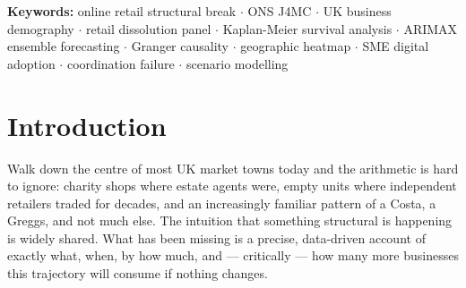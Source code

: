 \documentclass[12pt,a4paper]{article}
\begin{document}
\begin{abstract}
\medskip\noindent
Monthly Granger causality testing (lags 1--12, COVID moratorium excluded,
$n=118$) finds dominant causality at lag~1 ($F=25.26$, $p<0.001$) and
lag~2 ($F=4.43$, $p=0.014$), \textbf{sharpening the previously estimated
24-month annual lag to a 1--2 month transmission window}.

\medskip\noindent
Scenario forecasting using a weighted ensemble model (52\% Holt linear
smoothing + 48\% ARIMAX(2,1,1)) --- validated by rolling 12-month-ahead
backtests, OOS RMSE~$\approx$2,800 --- projects \textbf{547,167 cumulative
retail dissolutions} under business-as-usual conditions
(February~2026 to January~2030). A policy intervention scenario deploying
the FM1--FM3 platform specification reduces this to 440,737,
\textbf{saving approximately 106,400 businesses by January~2030}.

\medskip\noindent
The evidence is synthesised into a formal coordination failure model with
three interdependent failure modes --- discovery, presentation, and incentive ---
each directly evidenced by specific quantitative findings from both the
time-series and dissolution data.

\medskip\noindent
\textbf{JEL Classification:} L81 $\cdot$ O33 $\cdot$ R11
\qquad
\textbf{Period:} January~2015~-- January~2026
\end{abstract}

\medskip
\noindent\textbf{Keywords:} online retail structural break $\cdot$
ONS J4MC $\cdot$ UK business demography $\cdot$ retail dissolution panel $\cdot$
Kaplan-Meier survival analysis $\cdot$ ARIMAX ensemble forecasting $\cdot$
Granger causality $\cdot$ geographic heatmap $\cdot$ SME digital adoption $\cdot$
coordination failure $\cdot$ scenario modelling

\clearpage
\tableofcontents
\clearpage

\section{Introduction}

Walk down the centre of most UK market towns today and the arithmetic is hard to ignore:
charity shops where estate agents were, empty units where independent retailers traded for
decades, and an increasingly familiar pattern of a Costa, a Greggs, and not much else.
The intuition that something structural is happening is widely shared. What has been missing
is a precise, data-driven account of exactly what, when, by how much, and --- critically ---
how many more businesses this trajectory will consume if nothing changes.
\end{document}
